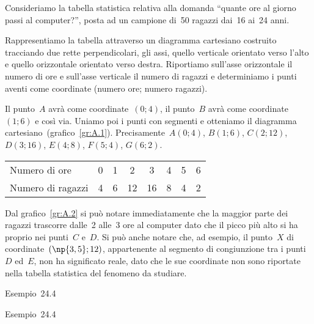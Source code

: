\begin{exrig}
 \begin{esempio}

Consideriamo la tabella statistica relativa alla domanda ``quante ore al giorno passi al computer?'', posta ad un
campione di~50 ragazzi dai~16 ai~24 anni.

Rappresentiamo la tabella attraverso un diagramma cartesiano costruito tracciando due rette perpendicolari, gli assi, quello verticale orientato verso
l'alto e quello orizzontale orientato verso destra. Riportiamo sull'asse orizzontale il numero di ore e sull'asse verticale il numero di ragazzi e determiniamo
i punti aventi come coordinate (numero ore; numero ragazzi).

Il punto~$A$ avrà come coordinate~$(0;4)$, il punto~$B$ avrà come coordinate~$(1;6)$ e così via. Uniamo poi
i punti con segmenti e otteniamo il diagramma cartesiano~(grafico~\ref{gr:A.1}).
Precisamente~$A(0;4)$, $B(1;6)$, $C(2;12)$, $D(3;16)$, $E(4;8)$, $F(5;4)$, $G(6;2)$.

\begin{center}
\begin{tabular}{lccccccc}
\toprule
Numero di ore & 0 & 1 &2 & 3 & 4 & 5 & 6\\
Numero di ragazzi & 4 & 6 & 12 & 16 & 8 & 4 & 2 \\
\bottomrule
\end{tabular}
\end{center}
Dal grafico~\ref{gr:A.2} si può notare immediatamente che la maggior parte dei ragazzi trascorre dalle~2 alle~3 ore al computer dato che il picco più
alto si ha proprio nei punti~$C$ e~$D$.
Si può anche notare che, ad esempio, il punto~$X$ di coordinate~$(\np{3,5};12)$, appartenente al segmento di congiunzione tra i punti~$D$ ed~$E$,
non ha significato reale, dato che le sue coordinate non sono riportate nella tabella statistica del fenomeno da studiare.
\begin{grafico}[t]
\begin{minipage}{0.5\textwidth}

\caption{Esempio~24.4}\label{gr:A.1}
\end{minipage}\hfill
\begin{minipage}{0.5\textwidth}

\caption{Esempio~24.4}\label{gr:A.2}
\end{minipage}
\end{grafico}
\end{esempio}
\end{exrig}

